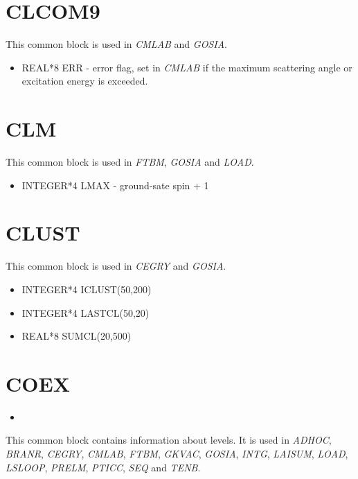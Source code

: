 \section{CLCOM9}

This common block is used in {\em CMLAB} and {\em GOSIA}.

\begin{itemize}
\item REAL*8 ERR - error flag, set in {\em CMLAB} if the maximum scattering
angle or excitation energy is exceeded.
\end{itemize}

\section{CLM}

This common block is used in {\em FTBM}, {\em GOSIA} and {\em LOAD}.

\begin{itemize}
\item INTEGER*4 LMAX - ground-sate spin + 1
\end{itemize}

\section{CLUST}

This common block is used in {\em CEGRY} and {\em GOSIA}.

\begin{itemize}
\item INTEGER*4 ICLUST(50,200)
\item INTEGER*4 LASTCL(50,20)
\item REAL*8 SUMCL(20,500)
\end{itemize}

\section{COEX}

\begin{itemize}
\item 
\end{itemize}

This common block contains information about levels. It is used in {\em
ADHOC}, {\em BRANR}, {\em CEGRY}, {\em CMLAB}, {\em FTBM}, {\em GKVAC}, {\em
GOSIA}, {\em INTG}, {\em LAISUM}, {\em LOAD}, {\em LSLOOP}, {\em PRELM},
{\em PTICC}, {\em SEQ} and {\em TENB}.

